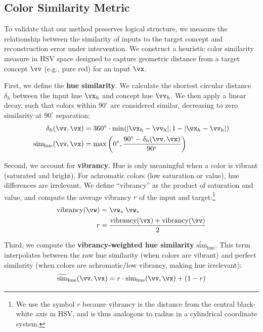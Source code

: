 \subsection{Color Similarity Metric}
\label{sec:color_similarity}

To validate that our method preserves logical structure, we measure the relationship between the similarity of inputs to the target concept and reconstruction error under intervention. We construct a heuristic color similarity measure in HSV space designed to capture geometric distance from a target concept $\vv$ (e.g., pure red) for an input $\vx$.

First, we define the \textbf{hue similarity}. We calculate the shortest circular distance $\delta_h$ between the input hue $\vx_h$ and concept hue $\vv_h$. We then apply a linear decay, such that colors within $90^{\circ}$ are considered similar, decreasing to zero similarity at $90^{\circ}$ separation:
\begin{align}
    \delta_h(\vv,\vx) &= 360^{\circ} \cdot \min(|\vx_h - \vv_h|, 1 - |\vx_h - \vv_h|) \\
    \text{sim}_{\text{hue}}(\vv,\vx) &= \max\left(0^{\circ}, \frac{90^{\circ} - \delta_h(\vv,\vx)}{90^{\circ}}\right)
\end{align}

Second, we account for \textbf{vibrancy}. Hue is only meaningful when a color is vibrant (saturated and bright). For achromatic colors (low saturation or value), hue differences are irrelevant. We define ``vibrancy'' as the product of saturation and value, and compute the average vibrancy $r$ of the input and target:\footnote{We use the symbol $r$ because vibrancy is the distance from the central black-white axis in HSV, and is thus analogous to radius in a cylindrical coordinate system.}
\begin{align}
    \text{vibrancy}(\vw) &= \vw_s \; \vw_v \label{eq:vibrancy} \\
    r &= \frac{\text{vibrancy}(\vx) + \text{vibrancy}(\vv)}{2}
\end{align}

Third, we compute the \textbf{vibrancy-weighted hue similarity} $\widetilde{\text{sim}}_{\text{hue}}$. This term interpolates between the raw hue similarity (when colors are vibrant) and perfect similarity (when colors are achromatic/low vibrancy, making hue irrelevant):
\begin{equation}
    \widetilde{\text{sim}}_{\text{hue}}(\vv,\vx) = r \cdot \text{sim}_{\text{hue}}(\vv,\vx) + (1 - r)
\end{equation}

